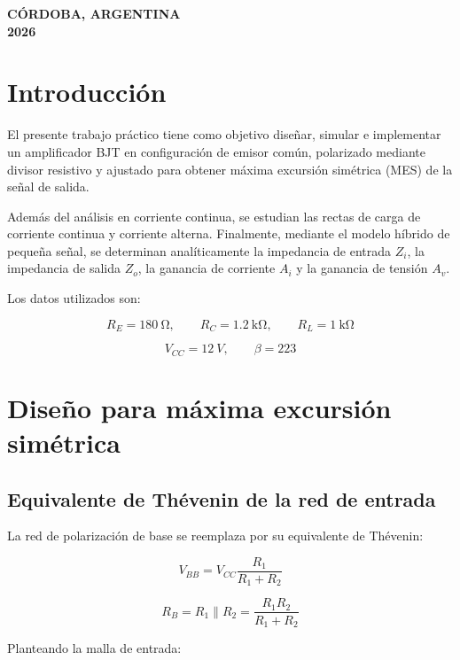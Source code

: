 \documentclass[a4paper,12pt]{article}
\begin{document}
\vfill
\begin{center}
    \textbf{CÓRDOBA, ARGENTINA}\\
    \textbf{2026}
\end{center}

\newpage
{}
\pagestyle{miestilo}

\tableofcontents
\newpage

\section{Introducción}

El presente trabajo práctico tiene como objetivo diseñar, simular e implementar un amplificador
BJT en configuración de emisor común, polarizado mediante divisor resistivo y ajustado para obtener
máxima excursión simétrica (MES) de la señal de salida.

Además del análisis en corriente continua, se estudian las rectas de carga de corriente continua y
corriente alterna. Finalmente, mediante el modelo híbrido de pequeña señal, se determinan
analíticamente la impedancia de entrada $Z_i$, la impedancia de salida $Z_o$, la ganancia de
corriente $A_i$ y la ganancia de tensión $A_v$.

Los datos utilizados son:

\[
R_E=\SI{180}{\ohm},\qquad
R_C=\SI{1.2}{\kilo\ohm},\qquad
R_L=\SI{1}{\kilo\ohm}
\]

\[
V_{CC}=\SI{12}{V},\qquad
\beta=223
\]

\section{Diseño para máxima excursión simétrica}

\subsection{Equivalente de Thévenin de la red de entrada}

La red de polarización de base se reemplaza por su equivalente de Thévenin:

\[
V_{BB}=V_{CC}\frac{R_1}{R_1+R_2}
\]

\[
R_B=R_1\parallel R_2
=\frac{R_1R_2}{R_1+R_2}
\]

Planteando la malla de entrada:
\end{document}
